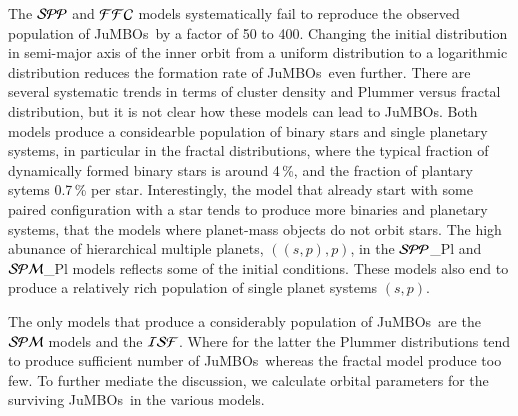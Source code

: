 \documentclass[submission,phys]{lib/SciPost}
\newcommand{\jumbos}{\mbox{JuMBOs}}
\begin{document}
The ${\cal SPP}$ and ${\cal FFC}$ models systematically fail to
reproduce the observed population of \jumbos\, by a factor of 50 to
400. Changing the initial distribution in semi-major axis of the inner
orbit from a uniform distribution to a logarithmic distribution
reduces the formation rate of \jumbos\, even further.  There are
several systematic trends in terms of cluster density and Plummer
versus fractal distribution, but it is not clear how these models can
lead to \jumbos. Both models produce a considearble population of
binary stars and single planetary systems, in particular in the
fractal distributions, where the typical fraction of dynamically
formed binary stars is around 4\,\%, and the fraction of plantary
sytems 0.7\,\% per star.  Interestingly, the model that already start
with some paired configuration with a star tends to produce more
binaries and planetary systems, that the models where planet-mass
objects do not orbit stars.  The high abunance of hierarchical
multiple planets, $((s,p),p)$, in the ${\cal SPP}$\_Pl and ${\cal
  SPM}$\_Pl models reflects some of the initial conditions. These
models also end to produce a relatively rich population of single
planet systems $(s,p)$.

The only models that produce a considerably population of \jumbos\,
are the ${\cal SPM}$ models and the ${\cal ISF}$. Where for the latter
the Plummer distributions tend to produce sufficient number of
\jumbos\, whereas the fractal model produce too few.  To further
mediate the discussion, we calculate orbital parameters for the
surviving \jumbos\, in the various models.
\end{document}
